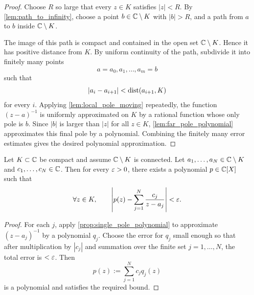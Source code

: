 \begin{proof}
    Choose \(R\) so large that every \(z \in K\) satisfies \(|z| < R\). By
    \cref{lem:path_to_infinity}, choose a point \(b \in \mathbb{C} \setminus K\) with
    \(|b|>R\), and a path from \(a\) to \(b\) inside \(\mathbb{C} \setminus K\).

    The image of this path is compact and contained in the open set
    \(\mathbb{C} \setminus K\). Hence it has positive distance from \(K\). By uniform
    continuity of the path, subdivide it into finitely many points
    \[
      a=a_0,a_1,\dots,a_m=b
    \]
    such that
    \[
      |a_i-a_{i+1}| < \operatorname{dist}(a_{i+1},K)
    \]
    for every \(i\). Applying \cref{lem:local_pole_moving} repeatedly, the function
    \((z-a)^{-1}\) is uniformly approximated on \(K\) by a rational function whose
    only pole is \(b\). Since \(|b|\) is larger than \(|z|\) for all \(z \in K\),
    \cref{lem:far_pole_polynomial} approximates this final pole by a polynomial.
    Combining the finitely many error estimates gives the desired polynomial
    approximation.
\end{proof}

\begin{proposition}
    \label{prop:finite_pole_sum_polynomial}
    Let \(K \subset \mathbb{C}\) be compact and assume \(\mathbb{C} \setminus K\) is connected. Let
    \(a_1,\dots,a_N \in \mathbb{C} \setminus K\) and \(c_1,\dots,c_N \in \mathbb{C}\). Then for
    every \(\varepsilon > 0\), there exists a polynomial \(p \in \mathbb{C}[X]\) such that
    \[
      \forall z \in K,\qquad
      \left|
        p(z) -
        \sum_{j=1}^N \frac{c_j}{z-a_j}
      \right|
      < \varepsilon .
    \]
\end{proposition}

\begin{proof}
    For each \(j\), apply \cref{prop:single_pole_polynomial} to approximate
    \((z-a_j)^{-1}\) by a polynomial \(q_j\). Choose the error for \(q_j\) small
    enough so that after multiplication by \(|c_j|\) and summation over the finite
    set \(j=1,\dots,N\), the total error is \(<\varepsilon\). Then
    \[
      p(z) := \sum_{j=1}^N c_j q_j(z)
    \]
    is a polynomial and satisfies the required bound.
\end{proof}


